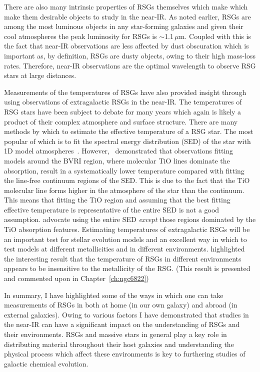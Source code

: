 {There are also many intrinsic properties of RSGs themselves which make  which make them desirable objects to study in the near-IR.
As noted earlier, RSGs are among the most luminous objects in any star-forming galaxies and given their cool atmospheres the peak luminosity for RSGs is $\sim$1.1\,$\mu$m.
Coupled with this is the fact that near-IR observations are less affected by dust obscuration which is important as, by definition, RSGs are dusty objects, owing to their high mass-loss rates.
Therefore, near-IR observations are the optimal wavelength to observe RSG stars at large distances.

Measurements of the temperatures of RSGs have also provided insight through using observations of extragalactic RSGs in the near-IR.
The temperatures of RSG stars have been subject to debate for many years which again is likely a product of their complex atmosphere and surface structure.
There are many methods by which to estimate the effective temperature of a RSG star.
The most popular of which is to fit the spectral energy distribution (SED) of the star with 1D model atmospheres~\citep{Levesque05,Levesque06}.
However,~\cite{2013ApJ...767....3D} demonstrated that observations fitting models around the BVRI region, where molecular TiO lines dominate the absorption, result in a systematically lower temperature compared with fitting the line-free continuum regions of the SED.
This is due to the fact that the TiO molecular line forms higher in the atmosphere of the star than the continuum.
This means that fitting the TiO region and assuming that the best fitting effective temperature is representative of the entire SED is not a good assumption.
\cite{2013ApJ...767....3D} advocate using the entire SED \textit{except} those regions dominated by the TiO absorption features.
Estimating temperatures of extragalactic RSGs will be an important test for stellar evolution models and an excellent way in which to test models at different metallicities and in different environments.
\cite{2015ApJ...803...14P} highlighted the interesting result that the temperature of RSGs in different environments appears to be insensitive to the metallicity of the RSG. (This result is presented and commented upon in Chapter~\ref{ch:ngc6822})

In summary, I have highlighted some of the ways in which one can take measurements of RSGs in both at home (in our own galaxy) and abroad (in external galaxies).
Owing to various factors I have demonstrated that studies in the near-IR can have a significant impact on the understanding of RSGs and their environments.
RSGs and massive stars in general play a key role in distributing material throughout their host galaxies and understanding the physical process which affect these environments is key to furthering studies of galactic chemical evolution.



}
